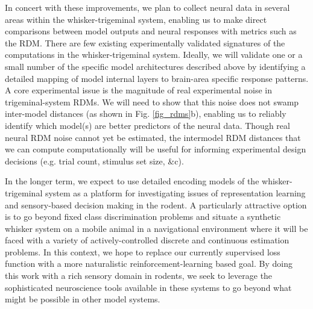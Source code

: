 In concert with these improvements, we plan to collect neural data in several areas within the whisker-trigeminal system, enabling us to make direct comparisons between model outputs and neural responses with metrics such as the RDM.  
There are few existing experimentally validated signatures of the computations in the whisker-trigeminal system.  Ideally, we will validate one or a small number of the specific model architectures described above by identifying a detailed mapping of model internal layers to brain-area specific response patterns.
A core experimental issue is the magnitude of real experimental noise in trigeminal-system RDMs. 
We will need to show that this noise does not swamp inter-model distances (as shown in Fig. \ref{fig_rdms}b), enabling us to reliably identify which model(s) are better predictors of the neural data.
Though real neural RDM noise cannot yet be estimated, the inter­model RDM distances that we can compute computationally will be useful for informing experimental design decisions (e.g. trial count, stimulus set size, \&c).

In the longer term, we expect to use detailed encoding models of the whisker-trigeminal system as a platform for investigating issues of representation learning and sensory-based decision making in the rodent. 
A particularly attractive option is to go beyond fixed class discrimination problems and situate a synthetic whisker system on a mobile animal in a navigational environment where it will be faced with a variety of actively-controlled discrete and continuous estimation problems.
In this context, we hope to replace our currently supervised loss function with a more naturalistic reinforcement-learning based goal.
By doing this work with a rich sensory domain in rodents, we seek to leverage the sophisticated neuroscience tools available in these systems to go beyond what might be possible in other model systems.  

